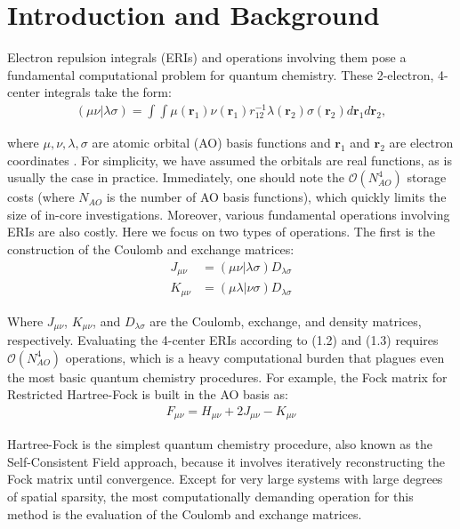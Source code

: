 \chapter{Introduction and Background}

Electron repulsion integrals (ERIs) and operations involving them pose a fundamental
computational problem for quantum chemistry. These 2-electron, 4-center integrals take the form:
\begin{align}(\mu \nu | \lambda \sigma) = \int \int \mu(\textbf{r}_{1}) 
\nu(\textbf{r}_{1}) r^{-1}_{12} \lambda(\textbf{r}_{2}) \sigma(\textbf{r}_{2}) 
d{\textbf{r}_{1}}d{\textbf{r}_{2}},
\end{align}

\noindent where $\mu, \nu, \lambda, \sigma$ are atomic orbital (AO) basis functions and $\textbf{r}_{1}$ and $\textbf{r}_{2}$
are electron coordinates \cite{ref1}. For simplicity, we have assumed the orbitals are real functions, as is usually
the case in practice. Immediately, one should note the $\mathcal{O}(N_{AO}^4)$ storage costs (where $N_{AO}$ is
the number of AO basis functions), which quickly 
limits the size of in-core investigations. Moreover, various fundamental operations involving ERIs 
are also costly. Here we focus on two types of operations. 
The first is the construction of the Coulomb and exchange matrices:
\begin{align}
J_{\mu \nu} &= (\mu \nu|\lambda \sigma)D_{\lambda \sigma} \\
K_{\mu \nu} &= (\mu \lambda|\nu \sigma)D_{\lambda \sigma}
\end{align}

\noindent Where $J_{\mu \nu}$, $K_{\mu \nu}$, 
and $D_{\lambda \sigma}$ are the Coulomb, exchange, and density matrices, respectively.
Evaluating the 4-center ERIs according to (1.2) and (1.3) requires $\mathcal{O}(N_{AO}^4)$ operations, 
which is a heavy computational burden that plagues even the most basic quantum chemistry procedures.
For example, the Fock matrix for Restricted Hartree-Fock is built in the AO basis as:
\begin{align}
F_{\mu \nu} = H_{\mu \nu} + 2J_{\mu \nu} - K_{\mu \nu}
\end{align} 

Hartree-Fock is the simplest quantum chemistry procedure, also known as the Self-Consistent Field approach, 
because it involves iteratively
reconstructing the Fock matrix until convergence. Except for very large systems with large degrees of spatial sparsity, 
the most computationally demanding operation for this
method is the evaluation of the Coulomb and exchange matrices. 
 
